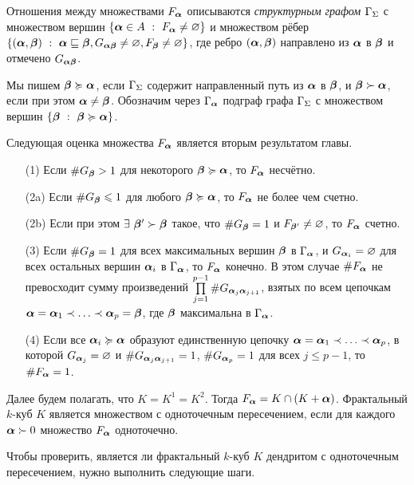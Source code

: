 \documentclass[a5paper,9pt,twoside]{extarticle} %
\begin{document}
Отношения между множествами $F_{\bm{\alpha}}$ описываются {\em структурным графом $\Gamma_\Sigma$} с множеством вершин $\{{\bm{\alpha}}\in A\ :\ F_{\bm{\alpha}}\neq\varnothing\}$ и множеством рёбер $\{(\bma, \bmb)\ :\ \bma\sqsubseteq\bmb, G_{\bma\bmb}\neq\0, F_\bmb\neq\0\}$, где ребро $({\bm{\alpha}}, {\bm{\beta}})$ направлено из ${\bm{\alpha}}$ в ${\bm{\beta}}$ и отмечено $G_{{\bm{\alpha}}{\bm{\beta}}}$.

Мы пишем ${\bm{\beta}}\succcurlyeq{\bm{\alpha}}$, если  $\Gamma_\Sigma$ содержит направленный путь из ${\bm{\alpha}}$ в ${\bm{\beta}}$, и ${\bm{\beta}}\succ{\bm{\alpha}}$, если при этом ${\bm{\alpha}}\neq{\bm{\beta}}$.
Обозначим через $\Gamma_{\bm{\alpha}}$ подграф графа $\Gamma_\Sigma$ с множеством вершин $\{{\bm{\beta}}\ :\ {\bm{\beta}}\succcurlyeq{\bm{\alpha}}\}$. 
 
Следующая оценка множества $F_{\bm{\alpha}}$ является вторым результатом главы.\\

{\em \begin{enumerate}[nolistsep]
\item[(1)] Если $\#G_{\bm{\beta}}>1$ для некоторого ${\bm{\beta}}\succcurlyeq{\bm{\alpha}}$, то  $F_{\bm{\alpha}}$ несчётно.
\item[(2a)] Если  $\#G_{\bm{\beta}}\leqslant1$ для любого ${\bm{\beta}}\succcurlyeq{\bm{\alpha}}$, то  $F_{\bm{\alpha}}$ не более чем счетно.
\item[(2b)] Если при этом $\exists\ {\bm{\beta}}'\succ{\bm{\beta}}$ такое, что $\#G_{\bm{\beta}}=1$ и $F_{{\bm{\beta}}'}\neq\varnothing$, то $F_{\bm{\alpha}}$ счетно.
\item[(3)] Если  $\#G_{\bm{\beta}}=1$ для всех максимальных вершин ${\bm{\beta}}$ в $\Gamma_{\bm{\alpha}}$, и $G_{{\bm{\alpha}}_i}=\varnothing$ для всех остальных вершин ${\bm{\alpha}}_i$ в $\Gamma_{\bm{\alpha}}$, то $F_{\bm{\alpha}}$ конечно.
В этом случае $\#F_{\bm{\alpha}}$ не превосходит сумму произведений $\prod \limits_{j=1}^{p-1}\# G_{{\bm{\alpha}}_j{\bm{\alpha}}_{j+1}}$, взятых по всем цепочкам ${\bm{\alpha}}={\bm{\alpha}}_1\prec\ldots\prec{\bm{\alpha}}_p={\bm{\beta}}$, где ${\bm{\beta}}$  максимальна в $\Gamma_{\bm{\alpha}}$.
\item[(4)] Если все ${\bm{\alpha}}_i\succcurlyeq{\bm{\alpha}}$ образуют единственную цепочку ${\bm{\alpha}}={\bm{\alpha}}_1\prec\ldots\prec{\bm{\alpha}}_p$, в которой $G_{{\bm{\alpha}}_j}=\varnothing$ и $\# G_{{\bm{\alpha}}_j{\bm{\alpha}}_{j+1}}=1$, $\#G_{{\bm{\alpha}}_p}=1$ для всех $j\le p-1$, то $\#F_{\bm{\alpha}}=1$.
\end{enumerate} \quad}

Далее будем полагать, что $K=K^1=K^2$.
Тогда $F_{\bm{\alpha}}=K\cap(K+{\bm{\alpha}})$.
Фрактальный $k$-куб $K$ является множеством с одноточечным пересечением, если для каждого ${\bm{\alpha}}\succ0$ множество $F_{\bm{\alpha}}$ одноточечно.

Чтобы проверить, является ли фрактальный $k$-куб $K$ дендритом с одноточечным пересечением, нужно выполнить следующие шаги.\\
\end{document}
